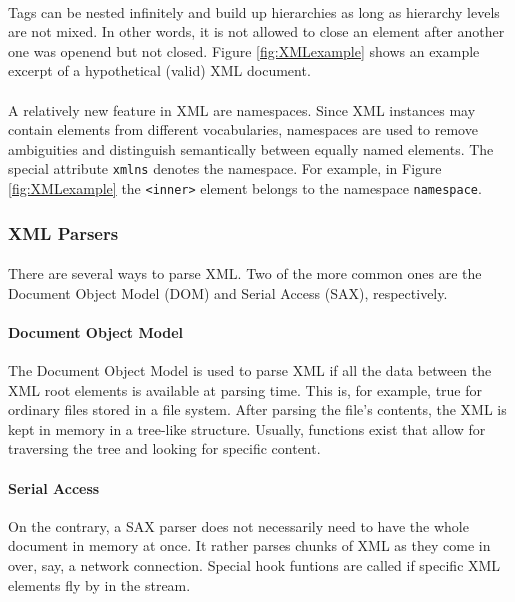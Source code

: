 \paragraph{}
Tags can be nested infinitely and build up hierarchies as long as hierarchy levels are not mixed. In other words, it is not allowed to close an element after another one was openend but not closed. Figure \ref{fig:XMLexample} shows an example excerpt of a hypothetical (valid) XML document.

\paragraph{}
A relatively new feature in XML are namespaces. Since XML instances may contain elements from different vocabularies, namespaces are used to remove ambiguities and distinguish semantically between equally nam\-ed elements. The special attribute \texttt{xmlns} denotes the namespace. For example, in Figure \ref{fig:XMLexample} the \texttt{<inner>} element belongs to the namespace \texttt{namespace}.

\subsubsection{XML Parsers}
\paragraph{}
There are several ways to parse XML. Two of the more common ones are the Document Object Model (DOM) and Serial Access (SAX), respectively.
\paragraph{Document Object Model}
The Document Object Model is used to parse XML if all the data between the XML root elements is available at parsing time. This is, for example, true for ordinary files stored in a file system. After parsing the file's contents, the XML is kept in memory in a tree-like structure. Usually, functions exist that allow for traversing the tree and looking for specific content.

\paragraph{Serial Access}
On the contrary, a SAX parser does not necessarily need to have the whole document in memory at once. It rather parses chunks of XML as they come in over, say, a network connection. Special hook funtions are called if specific XML elements fly by in the stream.


